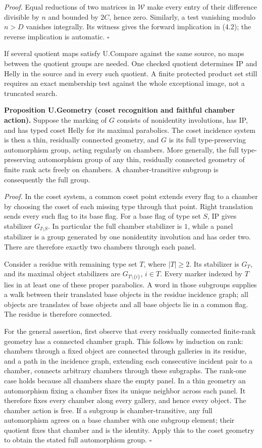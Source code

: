 \documentclass[
  11pt,
  a4paper,
]{article}
\begin{document}
\emph{Proof.} Equal reductions of two matrices in \(\mathcal W\) make
every entry of their difference divisible by \(n\) and bounded by
\(2C\), hence zero. Similarly, a test vanishing modulo \(n>D\) vanishes
integrally. Its witness gives the forward implication in (4.2); the
reverse implication is automatic. \(\square\)

If several quotient maps satisfy U.Compare against the same source, no
maps between the quotient groups are needed. One checked quotient
determines IP and Helly in the source and in every such quotient. A
finite protected product set still requires an exact membership test
against the whole exceptional image, not a truncated search.

\textbf{Proposition U.Geometry (coset recognition and faithful chamber
action).} Suppose the marking of \(G\) consists of nonidentity
involutions, has IP, and has typed coset Helly for its maximal
parabolics. The coset incidence system is then a thin, residually
connected geometry, and \(G\) is its full type-preserving automorphism
group, acting regularly on chambers. More generally, the full
type-preserving automorphism group of any thin, residually connected
geometry of finite rank acts freely on chambers. A chamber-transitive
subgroup is consequently the full group.

\emph{Proof.} In the coset system, a common coset point extends every
flag to a chamber by choosing the coset of each missing type through
that point. Right translation sends every such flag to its base flag.
For a base flag of type set \(S\), IP gives stabilizer
\(G_{I\setminus S}\). In particular the full chamber stabilizer is
\(1\), while a panel stabilizer is a group generated by one nonidentity
involution and has order two. There are therefore exactly two chambers
through each panel.

Consider a residue with remaining type set \(T\), where \(|T|\geq2\).
Its stabilizer is \(G_T\), and its maximal object stabilizers are
\(G_{T\setminus\{i\}}\), \(i\in T\). Every marker indexed by \(T\) lies
in at least one of these proper parabolics. A word in those subgroups
supplies a walk between their translated base objects in the residue
incidence graph; all objects are translates of base objects and all base
objects lie in a common flag. The residue is therefore connected.

For the general assertion, first observe that every residually connected
finite-rank geometry has a connected chamber graph. This follows by
induction on rank: chambers through a fixed object are connected through
galleries in its residue, and a path in the incidence graph, extending
each consecutive incident pair to a chamber, connects arbitrary chambers
through these subgraphs. The rank-one case holds because all chambers
share the empty panel. In a thin geometry an automorphism fixing a
chamber fixes its unique neighbor across each panel. It therefore fixes
every chamber along every gallery, and hence every object. The chamber
action is free. If a subgroup is chamber-transitive, any full
automorphism agrees on a base chamber with one subgroup element; their
quotient fixes that chamber and is the identity. Apply this to the coset
geometry to obtain the stated full automorphism group. \(\square\)
\end{document}
